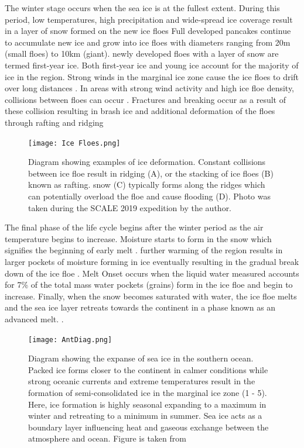 The winter stage occurs when the sea ice is at the fullest extent. During this period, low temperatures, high precipitation and wide-spread ice coverage result in a layer of snow formed on the new ice floes \cite{sturm2009snow}  Full developed pancakes continue to accumulate new ice and grow into ice floes with diameters ranging from 20m (small floes) to 10km (giant). newly developed floes with a layer of snow are termed first-year ice. Both first-year ice and young ice  account for the majority of ice in the region. Strong winds in the marginal ice zone cause the ice floes to drift over long distances \cite{alberello2019drift}. In areas with strong wind activity and high ice floe density, collisions between floes can occur \cite{Antseaice}. Fractures and breaking occur as a result of these collision resulting in brash ice \cite{icedefinition1992} and additional deformation of the floes through rafting and ridging \cite{icedefinition1992} \cite{womack_2020} \par 

\begin{figure}[H]
    \centering
    \texttt{[image: Ice Floes.png]}
    \caption{Diagram showing examples of ice deformation. Constant collisions between ice floe result in ridging (A), or the stacking of ice floes (B) known as rafting. snow (C) typically forms along the ridges which can potentially overload the floe and cause flooding (D). Photo was taken during the SCALE 2019 expedition by the author.}
    \label{fig:ice_deform}
\end{figure}
The final phase of the life cycle begins after the winter period as the air temperature begins to increase. Moisture starts to form in the snow which signifies the beginning of early melt \cite{barber2005microwave}. further warming of the region results in larger pockets of moisture forming in ice eventually resulting in the gradual break down of the ice floe \cite{barber2005microwave}. Melt Onset occurs when the liquid water measured accounts for 7\% \cite{barber2005microwave} of the total mass water pockets (grains) form in the ice floe and begin to increase. Finally, when the snow becomes saturated with water, the ice floe melts and the sea ice layer retreats towards the continent in a phase known as an advanced melt. \cite{barber2005microwave}.

\begin{figure}[H]
    \centering
    \texttt{[image: AntDiag.png]}
    \caption{Diagram showing the expanse of sea ice in the southern ocean. Packed ice forms closer to the continent in calmer conditions while strong oceanic currents and extreme temperatures result in the formation of semi-consolidated ice in the marginal ice zone (1 - 5). Here, ice formation is highly seasonal expanding to a maximum in winter and retreating to a minimum in summer. Sea ice acts as a boundary layer influencing heat and gaseous exchange between the atmosphere and ocean. Figure is taken from \cite{Antseaice}}
    \label{fig:sea_ice}
\end{figure}

